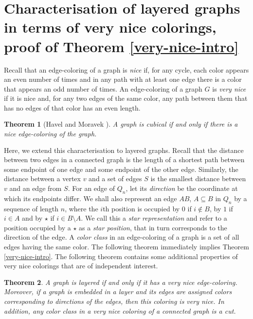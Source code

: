 \documentclass[11pt, a4paper]{article}
\newtheorem{theorem}{Theorem}
\begin{document}
\vskip 1cm



\section{Characterisation of layered graphs in terms of very nice colorings, proof of Theorem \ref{very-nice-intro}}\label{colorings}

	Recall that  an edge-coloring of a graph is {\it nice} if, for any cycle, each color appears an even number of times and in any path with at least one edge there is a color that appears an  odd number of times. An edge-coloring of a graph $G$ is {\it very nice} if  it is nice and, for any two edges of the same color, any path between them that has no edges of that color has an even length. 
	
	\begin{theorem}[Havel and Moravek \cite{HM}]
	A graph is cubical if and only if there is a nice edge-coloring of the graph. 
	\end{theorem}
		
		
	Here, we extend this characterisation to layered graphs. Recall that the distance between two edges in a connected graph is the length of a shortest path between some endpoint of one edge and some endpoint of the other edge. Similarly, the distance between a vertex $v$  and a set of edges $S$ is the smallest distance between $v$ and an edge from $S$. For an edge of $Q_n$, let its {\it direction} be the coordinate at which its endpoints differ.  We shall also represent an edge $AB$, $A\subseteq B$ in $Q_n$ by a sequence of length $n$, 
where the $i$th position is occupied by $0$ if $i\notin B$,  by $1$ if $i\in A$ and by $\star$ if $i\in B\setminus A$.  We call this a \textit{star representation} and refer to a position occupied by a $\star$ as a {\it star position}, that in turn corresponds to the direction of the edge.  A {\it color class} in an edge-coloring of a graph is a set of all edges having the same color. The following theorem immediately implies Theorem \ref{very-nice-intro}. The following theorem contains some additional properties of very nice colorings that are of independent interest.
	
	
\begin{theorem}\label{very-nice}
A graph is layered if and only if it has a very nice edge-coloring. Moreover, if a graph is embedded in a layer and its edges are assigned colors corresponding to directions of the edges, then this coloring is very nice. In addition, any color class in a very nice coloring of a connected graph is a cut.
\end{theorem}
	
\end{document}
